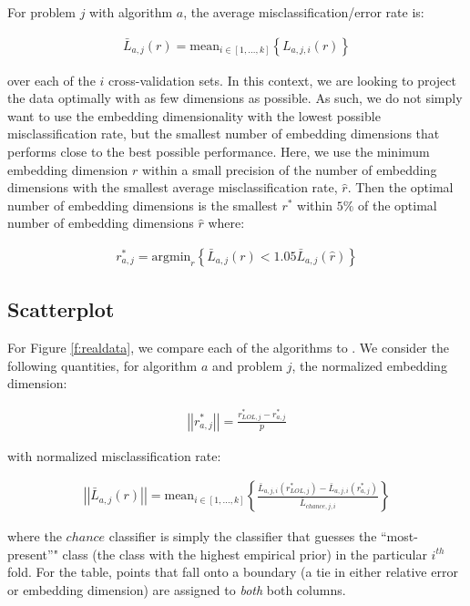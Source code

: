 \documentclass[11pt]{extarticle}
\begin{document}
For problem $j$ with algorithm $a$, the average misclassification/error rate is:

\begin{align*}
  \bar{L}_{a, j}(r) = \textrm{mean}_{i \in [1, ..., k]}\left\{L_{a, j, i}(r)\right\}
\end{align*}

over each of the $i$ cross-validation sets. In this context, we are looking to project the data optimally with as few dimensions as possible. As such, we do not simply want to use the embedding dimensionality with the lowest possible misclassification rate, but the smallest number of embedding dimensions that performs close to the best possible performance. Here, we use the minimum embedding dimension $r$ within a small precision of the number of embedding dimensions with the smallest average misclassification rate, $\hat{r}$. Then the optimal number of embedding dimensions is the smallest $r^*$ within $5\%$ of the optimal number of embedding dimensions $\hat{r}$ where:

\begin{align*}
  r^*_{a, j} = \textrm{argmin}_r\left\{\bar{L}_{a, j}(r) < 1.05 \bar{L}_{a, j}(\hat{r})\right\}
\end{align*}

\subsection{Scatterplot}

For Figure \ref{f:realdata}, we compare each of the algorithms to \Lol. We consider the following quantities, for algorithm $a$ and problem $j$, the normalized embedding dimension:

\begin{align*}
  \left|\left|r^*_{a, j}\right|\right| = \frac{r^*_{LOL, j} - r^*_{a, j}}{p}
\end{align*}

with normalized misclassification rate:

\begin{align*}
  \left|\left|\bar{L}_{a, j}(r)\right|\right| = \textrm{mean}_{i \in [1, ..., k]}\left\{\frac{\bar{L}_{a, j, i}\left(r^*_{LOL, j}\right) - \bar{L}_{a, j, i}\left(r^*_{a, j}\right)}{\bar{L}_{chance, j, i}}\right\}
\end{align*}

where the $chance$ classifier is simply the classifier that guesses the ``most-present''" class (the class with the highest empirical prior) in the particular $i^{th}$ fold. For the table, points that fall onto a boundary (a tie in either relative error or embedding dimension) are assigned to \textit{both} both columns.
\end{document}

